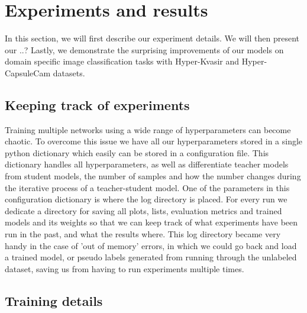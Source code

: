 \documentclass[thesis.tex]{subfiles}
\begin{document}
\chapter{Experiments and results} \label{chap:experiments}
In this section, we will first describe our experiment details. We will then present our ..?
Lastly, we demonstrate the surprising improvements of our models on domain specific image classification tasks with Hyper-Kvasir and Hyper-CapsuleCam datasets.




\section{Keeping track of experiments}
Training multiple networks using a wide range of hyperparameters can become chaotic. To overcome this issue we have all our hyperparameters stored in a single python dictionary which easily can be stored in a configuration file. This dictionary handles all hyperparameters, as well as differentiate teacher models from student models, the number of samples and how the number changes during the iterative process of a teacher-student model. One of the parameters in this configuration dictionary is where the log directory is placed. For every run we dedicate a directory for saving all plots, lists, evaluation metrics and trained models and its weights so that we can keep track of what experiments have been run in the past, and what the results where. This log directory became very handy in the case of 'out of memory' errors, in which we could go back and load a trained model, or pseudo labels generated from running through the unlabeled dataset, saving us from having to run experiments multiple times.



\section{Training details}
\end{document}
